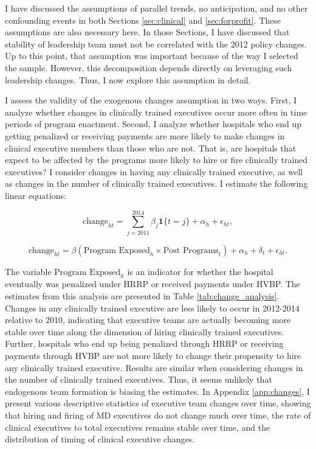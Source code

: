 \documentclass[12pt]{article}
\begin{document}
    I have discussed the assumptions of parallel trends, no anticipation, and no other confounding events in both Sections \ref{sec:clinical} and \ref{sec:forprofit}. These assumptions are also necessary here. In those Sections, I have discussed that stability of leadership team must not be correlated with the 2012 policy changes. Up to this point, that assumption was important because of the way I selected the sample. However, this decomposition depends directly on leveraging such leadership changes. Thus, I now explore this assumption in detail. 

     I assess the validity of the exogenous changes assumption in two ways. First, I analyze whether changes in clinically trained executives occur more often in time periods of program enactment. Second, I analyze whether hospitals who end up getting penalized or receiving payments are more likely to make changes in clinical executive members than those who are not. That is, are hospitals that expect to be affected by the programs more likely to hire or fire clinically trained executives? I consider changes in having any clinically trained executive, as well as changes in the number of clinically trained executives. I estimate the following linear equations:

    \begin{equation}\label{eq:change1}
    \text{change}_{ht} = \sum_{j=2011}^{2014}\beta_j\mathbf{1}\{t=j\} + \alpha_h + \epsilon_{ht},
    \end{equation}

    \begin{equation}\label{eq:change2}
    \text{change}_{ht} = \beta(\text{Program Exposed}_{h} \times \text{Post Programs}_t)+ \alpha_h + \delta_t + \epsilon_{ht}.
    \end{equation}

    The variable $\text{Program Exposed}_{h}$ is an indicator for whether the hospital eventually was penalized under HRRP or received payments under HVBP. The estimates from this analysis are presented in Table \ref{tab:change_analysis}. Changes in any clinically trained executive are less likely to occur in 2012-2014 relative to 2010, indicating that executive teams are actually becoming more stable over time along the dimension of hiring clinically trained executives. Further, hospitals who end up being penalized through HRRP or receiving payments through HVBP are not more likely to change their propensity to hire any clinically trained executive. Results are similar when considering changes in the number of clinically trained executives. Thus, it seems unlikely that endogenous team formation is biasing the estimates. In Appendix \ref{app:changes}, I present various descriptive statistics of executive team changes over time, showing that hiring and firing of MD executives do not change much over time, the rate of clinical executives to total executives remains stable over time, and the distribution of timing of clinical executive changes. 
\end{document}
